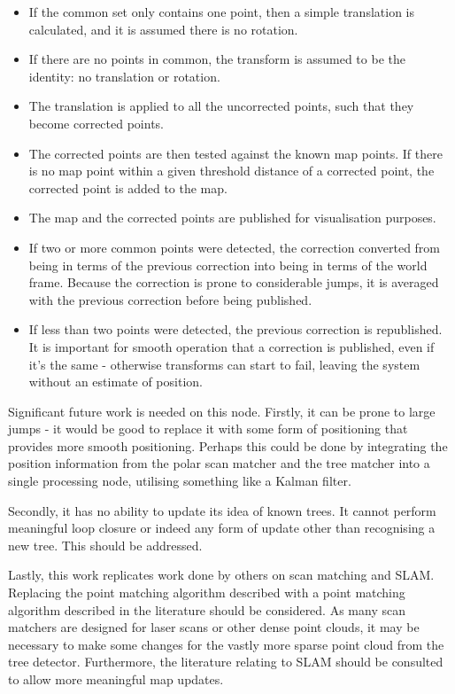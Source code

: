 \documentclass[12pt,oneside,a4paper,draft]{book}
\begin{document}
\begin{itemize}
\item If the common set only contains one point, then a simple
  translation is calculated, and it is assumed there is no rotation.
\item If there are no points in common, the transform is assumed to be
  the identity: no translation or rotation.
\item The translation is applied to all the uncorrected points, such
  that they become corrected points.
\item The corrected points are then tested against the known map
  points. If there is no map point within a given threshold distance
  of a corrected point, the corrected point is added to the map.
\item The map and the corrected points are published for visualisation
  purposes.
\item If two or more common points were detected, the correction
  converted from being in terms of the previous correction into being
  in terms of the world frame. Because the correction is prone to
  considerable jumps, it is averaged with the previous correction
  before being published.
\item If less than two points were detected, the previous correction
  is republished. It is important for smooth operation that a
  correction is published, even if it's the same - otherwise
  transforms can start to fail, leaving the system without an estimate
  of position.
\end{itemize}

Significant future work is needed on this node.  Firstly, it can be
prone to large jumps - it would be good to replace it with some form
of positioning that provides more smooth positioning. Perhaps this
could be done by integrating the position information from the polar
scan matcher and the tree matcher into a single processing node,
utilising something like a Kalman filter.

Secondly, it has no ability to update its idea of known trees. It
cannot perform meaningful loop closure or indeed any form of update
other than recognising a new tree. This should be addressed.

Lastly, this work replicates work done by others on scan matching and
SLAM. Replacing the point matching algorithm described with a point
matching algorithm described in the literature should be considered.
As many scan matchers are designed for laser scans or other dense
point clouds, it may be necessary to make some changes for the vastly
more sparse point cloud from the tree detector. Furthermore, the
literature relating to SLAM should be consulted to allow more
meaningful map updates.
\end{document}
